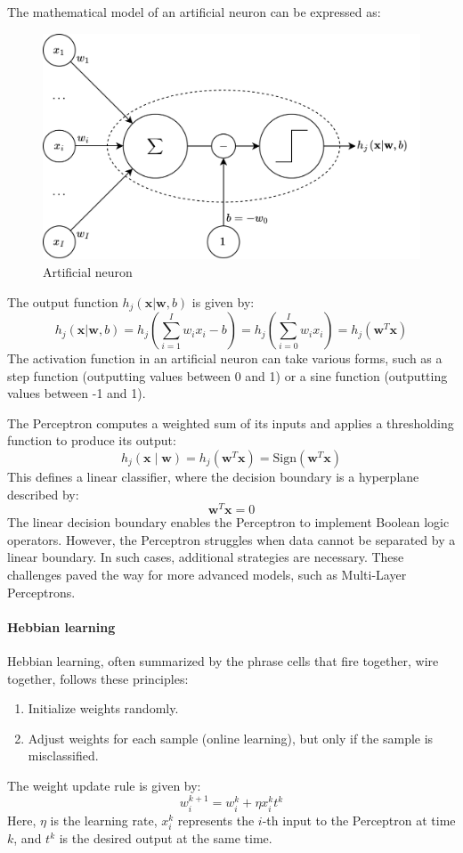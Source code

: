 The mathematical model of an artificial neuron can be expressed as:
\begin{figure}[H]
    \centering
    \includegraphics[width=0.75\linewidth]{images/neuron.png}
    \caption{Artificial neuron}
\end{figure}
\noindent The output function $h_j(\mathbf{x}|\mathbf{w},b)$ is given by:
\[h_j(\mathbf{x}|\mathbf{w},b)=h_j\left(\sum_{i=1}^Iw_ix_i-b\right)=h_j\left(\sum_{i=0}^Iw_ix_i\right)=h_j\left(\mathbf{w}^T\mathbf{x}\right)\]
\noindent The activation function in an artificial neuron can take various forms, such as a step function (outputting values between 0 and 1) or a sine function (outputting values between -1 and 1).

The Perceptron computes a weighted sum of its inputs and applies a thresholding function to produce its output:
\[h_j(\mathbf{x}\mid\mathbf{w})=h_j\left(\mathbf{w}^T\mathbf{x}\right)=\text{Sign}(\mathbf{w}^T\mathbf{x})\]
This defines a linear classifier, where the decision boundary is a hyperplane described by:
\[\mathbf{w}^T\mathbf{x}=0\]
The linear decision boundary enables the Perceptron to implement Boolean logic operators. 
However, the Perceptron struggles when data cannot be separated by a linear boundary.
In such cases, additional strategies are necessary. 
These challenges paved the way for more advanced models, such as Multi-Layer Perceptrons.

\paragraph*{Hebbian learning}
Hebbian learning, often summarized by the phrase cells that fire together, wire together, follows these principles:
\begin{enumerate}
    \item Initialize weights randomly.
    \item Adjust weights for each sample (online learning), but only if the sample is misclassified.
\end{enumerate}
The weight update rule is given by:
\[w_i^{k+1}=w_i^k+\eta x_i^kt^k\]
Here, $\eta$ is the learning rate, $x_i^k$ represents the $i$-th input to the Perceptron at time $k$, and $t^k$ is the desired output at the same time. 
